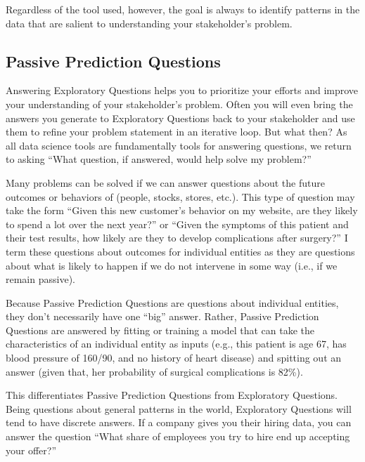 \documentclass[letterpaper,10pt,english]{jupyterBook}
\begin{document}
\sphinxAtStartPar
Regardless of the tool used, however, the goal is always to identify patterns in the data that are salient to understanding your stakeholder’s problem.


\subsection{Passive Prediction Questions}
\label{\detokenize{10_introduction/10_our_approach:passive-prediction-questions}}
\sphinxAtStartPar
Answering Exploratory Questions helps you to prioritize your efforts and improve your understanding of your stakeholder’s problem. Often you will even bring the answers you generate to Exploratory Questions back to your stakeholder and use them to refine your problem statement in an iterative loop. But what then? As all data science tools are fundamentally tools for answering questions, we return to asking “What question, if answered, would help solve my problem?”

\sphinxAtStartPar
Many problems can be solved if we can answer questions about the future outcomes or behaviors of  (people, stocks, stores, etc.). This type of question may take the form “Given this new customer’s behavior on my website, are they likely to spend a lot over the next year?” or “Given the symptoms of this patient and their test results, how likely are they to develop complications after surgery?” I term these questions about outcomes for individual entities  as they are questions about what is likely to happen if we do not intervene in some way (i.e., if we remain passive).

\sphinxAtStartPar
Because Passive Prediction Questions are questions about individual entities, they don’t necessarily have one “big” answer. Rather, Passive Prediction Questions are answered by fitting or training a model that can take the characteristics of an individual entity as inputs (e.g., this patient is age 67, has blood pressure of 160/90, and no history of heart disease) and spitting out an answer  (given that, her probability of surgical complications is 82\%).

\sphinxAtStartPar
This differentiates Passive Prediction Questions from Exploratory Questions. Being questions about general patterns in the world, Exploratory Questions will tend to have discrete answers. If a company gives you their hiring data, you can answer the question “What share of employees you try to hire end up accepting your offer?”
\end{document}
